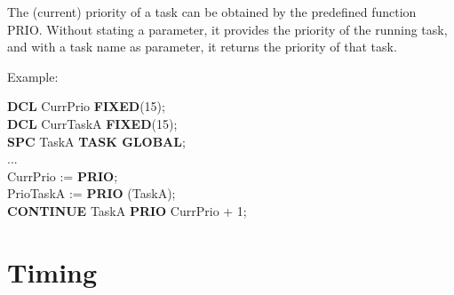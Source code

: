 The (current) priority of a task can be obtained by the predefined
function PRIO.
 Without stating a parameter, it provides the priority of
the running task, and with a task name as parameter, it returns the
priority of that task.

Example:

{\bf DCL} CurrPrio {\bf FIXED}(15);\\
{\bf DCL} CurrTaskA {\bf FIXED}(15);\\
{\bf SPC} TaskA {\bf TASK GLOBAL};\\
...\\
CurrPrio := {\bf PRIO};\\
PrioTaskA := {\bf PRIO} (TaskA);\\
{\bf CONTINUE} TaskA {\bf PRIO} CurrPrio + 1;

\section{Timing}

